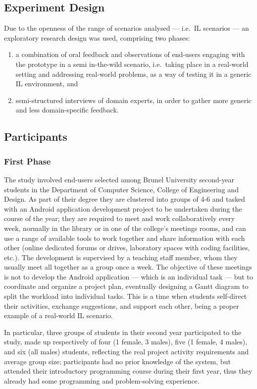 \subsection{Experiment Design}
Due to the openness of the range of scenarios analysed --- i.e.\ \ac{IL} scenarios --- an exploratory research design was used, comprising two phases:
\begin{enumerate}
  \item a combination of oral feedback and observations of end-users engaging with the prototype in a semi in-the-wild scenario, i.e.\ taking place in a real-world setting and addressing real-world problems, as a way of testing it in a generic \ac{IL} environment, and
  \item semi-structured interviews of domain experts, in order to gather more generic and less domain-specific feedback.
\end{enumerate}

\subsection{Participants}
\subsubsection{First Phase}
The study involved end-users selected among Brunel University second-year students in the Department of Computer Science, College of Engineering and Design. As part of their degree they are clustered into groups of 4-6 and tasked with an Android application development project to be undertaken during the course of the year; they are required to meet and work collaboratively every week, normally in the library or in one of the college's meetings rooms, and can use a range of available tools to work together and share information with each other (online dedicated forums or drives, laboratory spaces with coding facilities, etc.). The development is supervised by a teaching staff member, whom they usually meet all together as a group once a week. The objective of these meetings is not to develop the Android application --- which is an individual task --- but to coordinate and organize a project plan, eventually designing a Gantt diagram to split the workload into individual tasks. This is a time when students self-direct their activities, exchange suggestions, and support each other, being a proper example of a real-world \ac{IL} scenario.

In particular, three groups of students in their second year participated to the study, made up respectively of four (1 female, 3 males), five (1 female, 4 males), and six (all males) students, reflecting the real project activity requirements and average group size; participants had no prior knowledge of the system, but attended their introductory programming course during their first year, thus they already had some programming and problem-solving experience.

